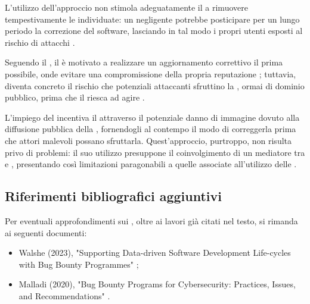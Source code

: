 L'utilizzo dell'approccio \fullvendordisclosure non stimola adeguatamente il \BI a rimuovere tempestivamente le \vulnerability individuate: un \BI negligente potrebbe posticipare per un lungo periodo la correzione del software, lasciando in tal modo i propri utenti esposti al rischio di attacchi \cite{lisi2022ard, cavusoglu2007vulndisc}.

\medskip

Seguendo il \fullpublicdisclosure, il \BI è motivato a realizzare un aggiornamento correttivo il prima possibile, onde evitare una compromissione della propria reputazione \cite{cavusoglu2007vulndisc, arora2010vulndisc}; tuttavia, diventa concreto il rischio che potenziali attaccanti sfruttino la \vulnerability, ormai di dominio pubblico, prima che il \BI riesca ad agire \cite{lisi2022ard, cavusoglu2007vulndisc, arora2010vulndisc}.

\medskip

L'impiego del \responsibledisclosure incentiva il \BI attraverso il potenziale danno di immagine dovuto alla diffusione pubblica della \vulnerability, fornendogli al contempo il modo di correggerla prima che attori malevoli possano sfruttarla. Quest'approccio, purtroppo, non risulta privo di problemi: il suo utilizzo presuppone il coinvolgimento di un mediatore tra \BI e \BH, presentando così limitazioni paragonabili a quelle associate all'utilizzo delle \bugbountyplatform.

\subsection{Riferimenti bibliografici aggiuntivi}

Per eventuali approfondimenti sui \BBP, oltre ai lavori già citati nel testo, si rimanda ai seguenti documenti: 
\begin{itemize}

\item Walshe (2023), "Supporting Data-driven Software Development Life-cycles with Bug Bounty Programmes" \cite{walshe2023bountythesis};

\item Malladi \etAl (2020), "Bug Bounty Programs for Cybersecurity: Practices, Issues, and Recommendations" \cite{malladi2020bugbounty}.


\end{itemize}

